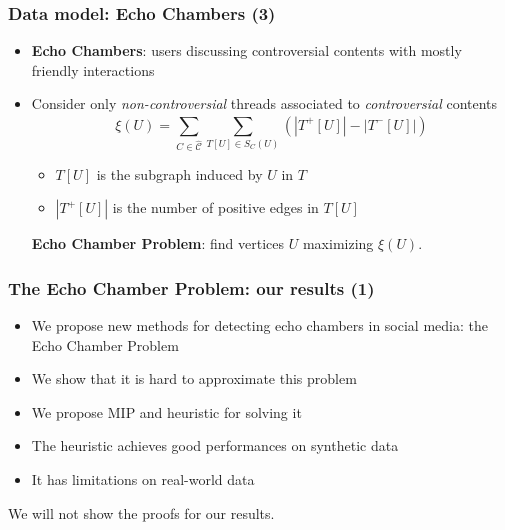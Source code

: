 \documentclass[aspectratio=169]{beamer}
\begin{document}
\begin{frame}[c]
	\frametitle{Data model: Echo Chambers (3)}

	\begin{itemize}
		\item \textbf{Echo Chambers}: users discussing controversial contents
		      with mostly friendly interactions
		      \medskip
		      \begin{center}
			      \bigg\downarrow
		      \end{center}
		      \medskip
		\item Consider only \emph{non-controversial} threads associated to
		      \emph{controversial} contents
		      \begin{equation*}
			      \xi(U) = \sum^{}_{C \in \hat{\mathcal{C}} } \sum^{}_{T[U] \in S_C (U)}
			      (| T^{+} [U] | - | T^{-} [U] |)
		      \end{equation*}
		      \begin{itemize}
			      \item $T[U]$ is the subgraph induced by $U$ in $T$
			      \item $|T^{+}[U]|$ is the number of positive edges in $T[U]$
		      \end{itemize}
		      \textbf{Echo Chamber Problem}: find vertices $U$ maximizing
		      $\xi(U)$.
	\end{itemize}


\end{frame}

\begin{frame}[c]
	\frametitle{The Echo Chamber Problem: our results (1)}
	\begin{itemize}
		\item We propose new methods for detecting echo
		      chambers in social media: the Echo Chamber Problem
		      \pause
		\item We show that it is hard to approximate this problem
		      \pause
		\item We propose MIP and heuristic for solving it
		      \pause
		\item The heuristic achieves good performances on synthetic data
		      \pause
		\item It has limitations on real-world data
	\end{itemize}
	\pause
	We will not show the proofs for our results.
\end{frame}
\end{document}
